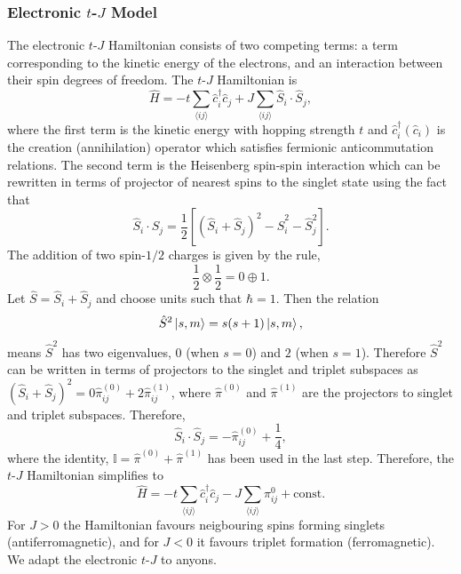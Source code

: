 \documentclass[aps,reprint,superscriptaddress,amsmath,amssymb,amsfonts,prb]{revtex4-1}
\begin{document}
\subsubsection{Electronic $t$-$J$ Model}
The electronic $t$-$J$ Hamiltonian consists of two competing terms: a term corresponding to the kinetic energy of the electrons, and an interaction between their spin degrees of freedom. The $t$-$J$ Hamiltonian is
\begin{equation}
\hat{H} = -t \sum_{\langle ij \rangle} \hat{c}_i^{\dagger} \hat{c}_j + J \sum_{\langle ij \rangle} \hat{S}_i \cdot \hat{S}_j ,
\end{equation}
where the first term is the kinetic energy with hopping strength $t$ and $\hat{c}_i^{\dagger}(\hat{c}_i)$ is the creation (annihilation) operator which satisfies fermionic anticommutation relations. The second term is the Heisenberg spin-spin interaction which can be rewritten in terms of projector of nearest spins to the singlet state using the fact that
\begin{equation}
\hat{S}_i \cdot \hat{S}_j  = \frac{1}{2}\left[(\hat{S}_i + \hat{S}_j)^2 - \hat{S}^2_i - \hat{S}^2_j  \right] .
\end{equation}
The addition of two spin-$1/2$ charges is given by the rule,
\begin{equation}
 \frac{1}{2} \otimes \frac{1}{2} = 0 \oplus 1.
\end{equation}
Let $\hat{S} = \hat{S}_i + \hat{S}_j$ and choose units such that $\hbar=1$. Then the relation
\begin{equation}
 \hat{S}^2 \ket{s, m} = s(s+1) \ket{s, m},
\end{equation}
means $\hat{S}^2$ has two eigenvalues, $0$ (when $s=0$) and $2$ (when $s=1$). Therefore $\hat{S}^2$ can be written in terms of projectors to the singlet and triplet subspaces as $(\hat{S}_i + \hat{S}_j)^2 = 0 \hat{\pi}^{(0)}_{ij} + 2 \hat{\pi}^{(1)}_{ij}$, where $\hat{\pi}^{(0)}$ and $\hat{\pi}^{(1)}$ are the projectors to singlet and triplet subspaces. Therefore,
\begin{equation}
\hat{S}_i \cdot \hat{S}_j = -\hat{\pi}^{(0)}_{ij} + \frac{1}{4} ,
\end{equation}
where the identity, $\mathbb{I} = \hat{\pi}^{(0)} + \hat{\pi}^{(1)}$ has been used in the last step. Therefore, the $t$-$J$ Hamiltonian simplifies to 
\begin{equation}
\hat{H} = -t \sum_{\langle ij \rangle} \hat{c}_i^{\dagger} \hat{c}_j - J\sum_{\langle ij \rangle} \pi_{ij}^0 + \text{const.}
\end{equation}
For $J>0$ the Hamiltonian favours neigbouring spins forming singlets (antiferromagnetic), and for $J<0$ it favours triplet formation (ferromagnetic). We adapt the electronic $t$-$J$ to anyons. 
\end{document}
